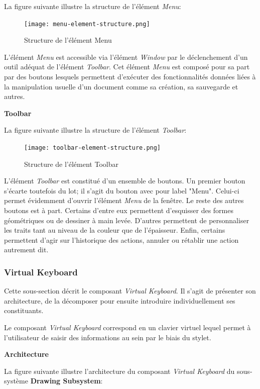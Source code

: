 \documentclass[11pt,a4paper,oldfontcommands]{memoir}
\begin{document}
La figure suivante illustre la structure de l'élément \textit{Menu}:

\begin{figure}[H]
\centering
\texttt{[image: menu-element-structure.png]}
\caption{Structure de l'élément Menu}
\end{figure}

L'élément \textit{Menu} est accessible via l'élément \textit{Window} par le déclenchement d'un outil adéquat de l'élément \textit{Toolbar}. Cet élément \textit{Menu} est composé pour sa part par des boutons lesquels permettent d'exécuter des fonctionnalités données liées à la manipulation usuelle d'un document comme sa création, sa sauvegarde et autres.

\newpage

\textbf{Toolbar}

La figure suivante illustre la structure de l'élément \textit{Toolbar}:

\begin{figure}[H]
\centering
\texttt{[image: toolbar-element-structure.png]}
\caption{Structure de l'élément Toolbar}
\end{figure}

L'élément \textit{Toolbar} est constitué d'un ensemble de boutons. Un premier bouton s'écarte toutefois du lot; il s'agit du bouton avec pour label "Menu". Celui-ci permet évidemment d'ouvrir l'élément \textit{Menu} de la fenêtre. Le reste des autres boutons est à part. Certains d'entre eux permettent d'esquisser des formes géométriques ou de dessiner à main levée. D'autres permettent de personnaliser les traits tant au niveau de la couleur que de l'épaisseur. Enfin, certains permettent d'agir sur l'historique des actions, annuler ou rétablir une action autrement dit.

\subsubsection{Virtual Keyboard}

Cette sous-section décrit le composant \textit{Virtual Keyboard}. Il s'agit de présenter son architecture, de la décomposer pour ensuite introduire individuellement ses constituants.

Le composant \textit{Virtual Keyboard} correspond en un clavier virtuel lequel permet à l'utilisateur de saisir des informations au sein par le biais du stylet.

\textbf{Architecture}

La figure suivante illustre l'architecture du composant \textit{Virtual Keyboard} du sous-système \textbf{Drawing Subsystem}:
\end{document}
